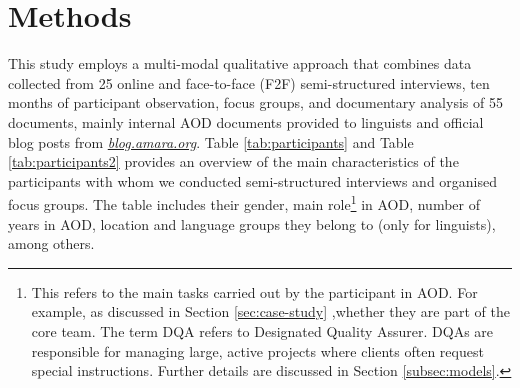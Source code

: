 
\section{Methods}\label{sec:methods}

This study employs a multi-modal qualitative approach that combines data collected from 25 online and face-to-face (F2F) semi-structured interviews, ten months of participant observation, focus groups, and documentary analysis of 55 documents, mainly internal AOD documents provided to linguists and official blog posts from \textit{\url{blog.amara.org}}. Table \ref{tab:participants} and Table \ref{tab:participants2} provides an overview of the main characteristics of the participants with whom we conducted semi-structured interviews and organised focus groups. The table includes their gender, main role\footnote{This refers to the main tasks carried out by the participant in AOD. For example, as discussed in Section \ref{sec:case-study} ,whether they are part of the core team. The term DQA refers to Designated Quality Assurer. DQAs are responsible for managing large, active projects where clients often request special instructions. Further details are discussed in Section \ref{subsec:models}.} in AOD, number of years in AOD, location and language groups they belong to (only for linguists), among others. 

